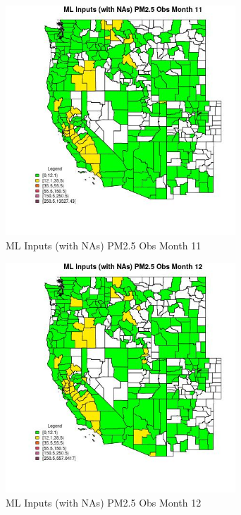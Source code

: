 \clearpage 

\begin{figure} 
\centering  
\includegraphics[width=0.77\textwidth]{Code_Outputs/Report_ML_input_PM25_Step4_part_f_de_duplicated_aveswNAs_CountyPM25_ObsmedianMonth11.jpg} 
\caption{\label{fig:Report_ML_input_PM25_Step4_part_f_de_duplicated_aveswNAsCountyPM25_ObsmedianMonth11}ML Inputs (with NAs) PM2.5 Obs Month 11} 
\end{figure} 
 

\begin{figure} 
\centering  
\includegraphics[width=0.77\textwidth]{Code_Outputs/Report_ML_input_PM25_Step4_part_f_de_duplicated_aveswNAs_CountyPM25_ObsmedianMonth12.jpg} 
\caption{\label{fig:Report_ML_input_PM25_Step4_part_f_de_duplicated_aveswNAsCountyPM25_ObsmedianMonth12}ML Inputs (with NAs) PM2.5 Obs Month 12} 
\end{figure} 
 

